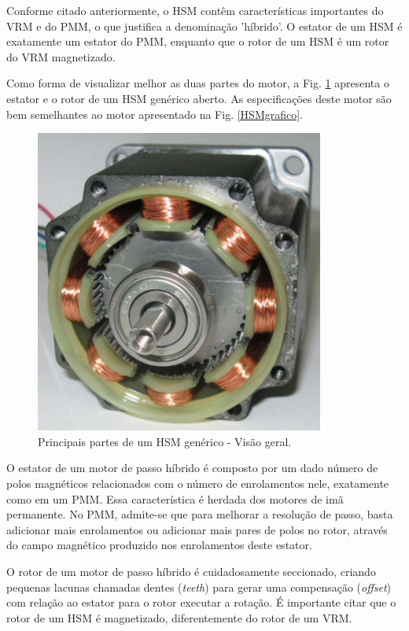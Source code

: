 	Conforme citado anteriormente, o HSM contêm características importantes do VRM e do PMM, o que justifica a denominação 'híbrido'. O estator de um HSM é exatamente um estator do PMM, enquanto que o rotor de um HSM é um rotor do VRM magnetizado.
	
	Como forma de visualizar melhor as duas partes do motor, a Fig. \ref{HSMreal} apresenta o estator e o rotor de um HSM genérico aberto. As especificações deste motor são bem semelhantes ao motor apresentado na Fig. \ref{HSMgrafico}.
	
	\begin{figure}[H]
		\centering
		\includegraphics[scale=.45]{Images/hsmreal1.png}
		\caption{Principais partes de um HSM genérico - Visão geral. \cite{ieeeRusso}}
		\label{HSMreal}
	\end{figure} 
	
	O estator de um motor de passo híbrido é composto por um dado número de polos magnéticos relacionados com o número de enrolamentos nele, exatamente como em um PMM. Essa característica é herdada dos motores de imã permanente. No PMM, admite-se que para melhorar a resolução de passo, basta adicionar mais enrolamentos ou adicionar mais pares de polos no rotor, através do campo magnético produzido nos enrolamentos deste estator. 
	
	O rotor de um motor de passo híbrido é cuidadosamente seccionado, criando pequenas lacunas chamadas dentes (\textit{teeth}) para gerar uma compensação (\textit{offset}) com relação ao estator para o rotor executar a rotação. É importante citar que o rotor de um HSM é magnetizado, diferentemente do rotor de um VRM.
	

